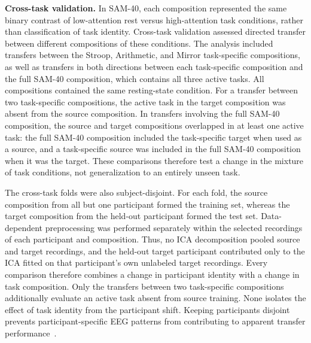 \documentclass[10pt,letterpaper]{article}
\newcommand{\rev}[1]{#1}
\begin{document}
\textbf{Cross-task validation.}
\rev{In SAM-40, each composition represented the same binary contrast of
low-attention rest versus high-attention task conditions, rather than
classification of task identity. Cross-task validation assessed directed
transfer between different compositions of these conditions. The analysis
included transfers between the Stroop, Arithmetic, and Mirror task-specific
compositions, as well as transfers in both directions between each
task-specific composition and the full SAM-40 composition, which
contains all three active tasks. All compositions contained the same
resting-state condition. For a transfer between two task-specific compositions,
the active task in the target composition was absent from the source
composition. In transfers involving the full SAM-40 composition, the source
and target compositions overlapped in at least one active task: the full
SAM-40 composition included the task-specific target when used as a source,
and a task-specific source was included in the full SAM-40 composition
when it was the target. These comparisons therefore test a change in the
mixture of task conditions, not generalization to an entirely unseen task.}

\rev{The cross-task folds were also subject-disjoint. For each fold, the source
composition from all but one participant formed the training set, whereas the
target composition from the held-out participant formed the test set.
Data-dependent preprocessing was performed separately within the selected
recordings of each participant and composition. Thus, no ICA decomposition
pooled source and target recordings, and the held-out target participant
contributed only to the ICA fitted on that participant's own unlabeled target
recordings. Every comparison therefore combines a change in participant
identity with a change in task composition. Only the transfers between two
task-specific compositions additionally evaluate an active task absent from
source training. None isolates the effect of task identity from the participant
shift. Keeping participants disjoint prevents participant-specific EEG
patterns from contributing to apparent transfer performance~\cite{kamrud2021vigilance,ke2021crosstask}.}
\end{document}
